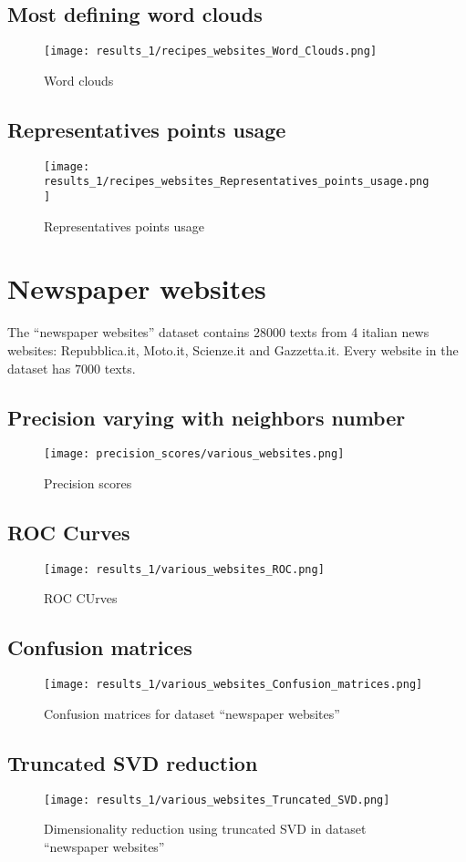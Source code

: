 \documentclass[\main/main.tex]{subfiles}
\begin{document}
\subsection{Most defining word clouds}
\begin{figure}
	\texttt{[image: results\_1/recipes\_websites\_Word\_Clouds.png]}
	\caption{Word clouds}
\end{figure}
\subsection{Representatives points usage}
\begin{figure}
	\texttt{[image: results\_1/recipes\_websites\_Representatives\_points\_usage.png]}
	\caption{Representatives points usage}
\end{figure}

\clearpage
\section{Newspaper websites}
The ``newspaper websites'' dataset contains \(28000\) texts from 4 italian news websites: Repubblica.it, Moto.it, Scienze.it and Gazzetta.it. Every website in the dataset has \(7000\) texts.
\subsection{Precision varying with neighbors number}
\begin{figure}
	\texttt{[image: precision\_scores/various\_websites.png]}
	\caption{Precision scores}
\end{figure}
\subsection{ROC Curves}
\begin{figure}
	\texttt{[image: results\_1/various\_websites\_ROC.png]}
	\caption{ROC CUrves}
\end{figure}
\subsection{Confusion matrices}
\begin{figure}
	\texttt{[image: results\_1/various\_websites\_Confusion\_matrices.png]}
	\caption{Confusion matrices for dataset ``newspaper websites''}
\end{figure}
\subsection{Truncated SVD reduction}
\begin{figure}
	\texttt{[image: results\_1/various\_websites\_Truncated\_SVD.png]}
	\caption{Dimensionality reduction using truncated SVD in dataset ``newspaper websites''}
\end{figure}
\end{document}
